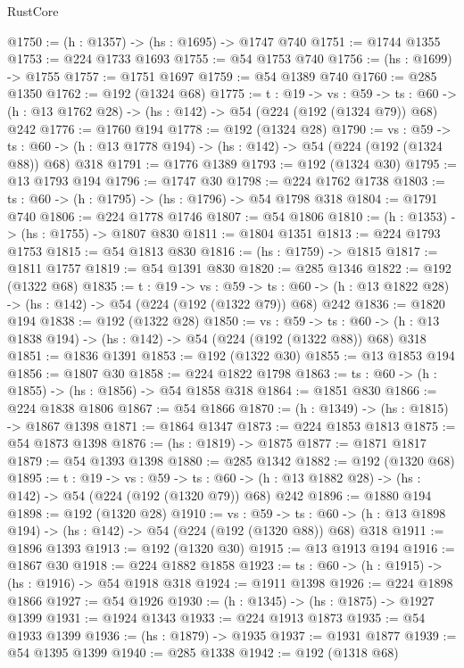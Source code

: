 \begin{lexlean}{RustCore}
\begin{coremodule}
@1750 := (h : @1357) -> (hs : @1695) -> @1747 @740
@1751 := @1744 @1355
@1753 := @224 @1733 @1693
@1755 := @54 @1753 @740
@1756 := (hs : @1699) -> @1755
@1757 := @1751 @1697
@1759 := @54 @1389 @740
@1760 := @285 @1350
@1762 := @192 (@1324 @68)
@1775 := {t : @19} ->
  {vs : @59} ->
  {ts : @60} -> (h : @13 @1762 @28) -> (hs : @142) -> @54 (@224 (@192 (@1324 @79)) @68) @242
@1776 := @1760 @194
@1778 := @192 (@1324 @28)
@1790 := {vs : @59} ->
  {ts : @60} -> (h : @13 @1778 @194) -> (hs : @142) -> @54 (@224 (@192 (@1324 @88)) @68) @318
@1791 := @1776 @1389
@1793 := @192 (@1324 @30)
@1795 := @13 @1793 @194
@1796 := @1747 @30
@1798 := @224 @1762 @1738
@1803 := {ts : @60} -> (h : @1795) -> (hs : @1796) -> @54 @1798 @318
@1804 := @1791 @740
@1806 := @224 @1778 @1746
@1807 := @54 @1806
@1810 := (h : @1353) -> (hs : @1755) -> @1807 @830
@1811 := @1804 @1351
@1813 := @224 @1793 @1753
@1815 := @54 @1813 @830
@1816 := (hs : @1759) -> @1815
@1817 := @1811 @1757
@1819 := @54 @1391 @830
@1820 := @285 @1346
@1822 := @192 (@1322 @68)
@1835 := {t : @19} ->
  {vs : @59} ->
  {ts : @60} -> (h : @13 @1822 @28) -> (hs : @142) -> @54 (@224 (@192 (@1322 @79)) @68) @242
@1836 := @1820 @194
@1838 := @192 (@1322 @28)
@1850 := {vs : @59} ->
  {ts : @60} -> (h : @13 @1838 @194) -> (hs : @142) -> @54 (@224 (@192 (@1322 @88)) @68) @318
@1851 := @1836 @1391
@1853 := @192 (@1322 @30)
@1855 := @13 @1853 @194
@1856 := @1807 @30
@1858 := @224 @1822 @1798
@1863 := {ts : @60} -> (h : @1855) -> (hs : @1856) -> @54 @1858 @318
@1864 := @1851 @830
@1866 := @224 @1838 @1806
@1867 := @54 @1866
@1870 := (h : @1349) -> (hs : @1815) -> @1867 @1398
@1871 := @1864 @1347
@1873 := @224 @1853 @1813
@1875 := @54 @1873 @1398
@1876 := (hs : @1819) -> @1875
@1877 := @1871 @1817
@1879 := @54 @1393 @1398
@1880 := @285 @1342
@1882 := @192 (@1320 @68)
@1895 := {t : @19} ->
  {vs : @59} ->
  {ts : @60} -> (h : @13 @1882 @28) -> (hs : @142) -> @54 (@224 (@192 (@1320 @79)) @68) @242
@1896 := @1880 @194
@1898 := @192 (@1320 @28)
@1910 := {vs : @59} ->
  {ts : @60} -> (h : @13 @1898 @194) -> (hs : @142) -> @54 (@224 (@192 (@1320 @88)) @68) @318
@1911 := @1896 @1393
@1913 := @192 (@1320 @30)
@1915 := @13 @1913 @194
@1916 := @1867 @30
@1918 := @224 @1882 @1858
@1923 := {ts : @60} -> (h : @1915) -> (hs : @1916) -> @54 @1918 @318
@1924 := @1911 @1398
@1926 := @224 @1898 @1866
@1927 := @54 @1926
@1930 := (h : @1345) -> (hs : @1875) -> @1927 @1399
@1931 := @1924 @1343
@1933 := @224 @1913 @1873
@1935 := @54 @1933 @1399
@1936 := (hs : @1879) -> @1935
@1937 := @1931 @1877
@1939 := @54 @1395 @1399
@1940 := @285 @1338
@1942 := @192 (@1318 @68)

\end{coremodule}
\end{lexlean}
